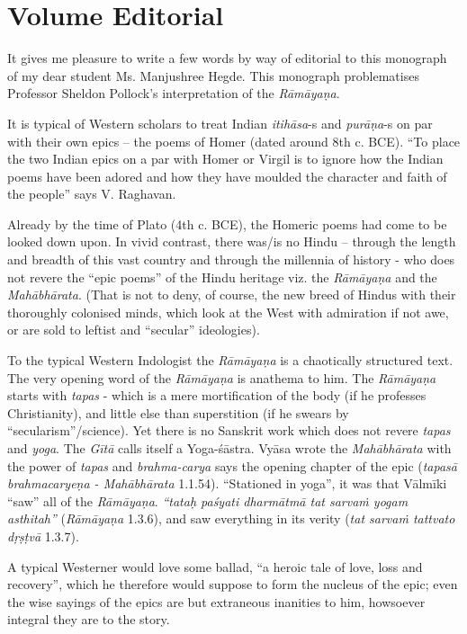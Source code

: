 \chapter*{Volume Editorial}\label{volume_editorial}



It gives me pleasure to write a few words by way of editorial to this monograph of my dear student Ms. Manjushree Hegde. This monograph problematises Professor Sheldon Pollock's interpretation of the {\sl Rāmāyaṇa}.

It is typical of Western scholars to treat Indian {\sl itihāsa}-s and {\sl purāṇa}-s on par with their own epics -- the poems of Homer (dated around 8th c. BCE). ``To place the two Indian epics on a par with Homer or Virgil is to ignore how the Indian poems have been adored and how they have moulded the character and faith of the people'' says V. Raghavan.
 
Already by the time of Plato (4th c. BCE), the Homeric poems had come to be looked down upon. In vivid contrast, there was/is no Hindu -- through  the length and breadth of this vast country and through the millennia of history - who does not revere the ``epic poems'' of the Hindu heritage viz. the {\sl Rāmāyaṇa} and the {\sl Mahābhārata}. (That is not to deny, of course, the new breed of Hindus with their thoroughly colonised minds, which look at the West with admiration if not awe, or are sold to leftist and ``secular'' ideologies).

To the typical Western Indologist the {\sl Rāmāyaṇa} is a chaotically structured text. The very opening word of the {\sl Rāmāyaṇa} is anathema to him. The {\sl Rāmāyaṇa} starts with {\sl tapas} -  which is a mere mortification of the body (if he professes Christianity), and little else than superstition (if he swears by ``secularism''/science). Yet there is no Sanskrit work which does not revere {\sl tapas} and {\sl yoga}. The {\sl Gītā} calls itself a Yoga-śāstra. Vyāsa wrote the {\sl Mahābhārata} with the power of {\sl tapas} and {\sl brahma-carya} says the opening chapter of the epic ({\sl tapasā brahmacaryeṇa  - Mahābhārata} 1.1.54). ``Stationed in yoga'', it was that Vālmīki  ``saw'' all of the {\sl Rāmāyaṇa}. {\sl ``tataḥ paśyati dharmātmā tat sarvaṁ yogam asthitah''} ({\sl Rāmāyaṇa} 1.3.6), and saw everything in its verity ({\sl tat sarvaṁ tattvato dṛṣṭvā} 1.3.7).

A typical Westerner would love some ballad, ``a heroic tale of love, loss and recovery'', which he therefore would suppose to form the nucleus of the epic; even the wise sayings of the epics are but extraneous inanities to him, howsoever integral they are to the story.

